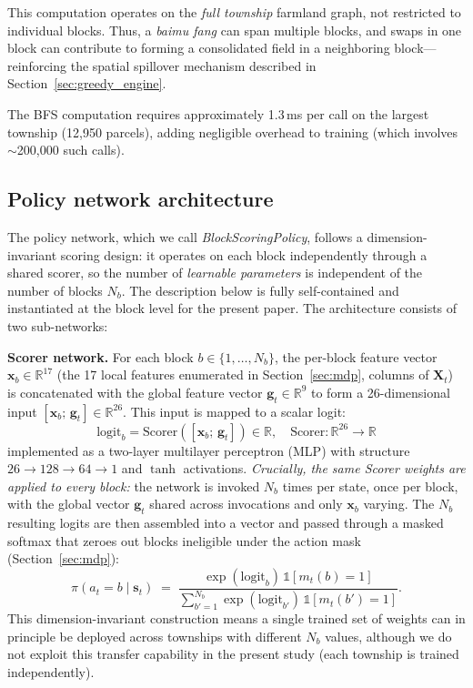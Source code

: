 \documentclass[preprint,12pt]{elsarticle}
\begin{document}
This computation operates on the \textit{full township} farmland graph, not restricted to individual blocks. Thus, a \textit{baimu fang} can span multiple blocks, and swaps in one block can contribute to forming a consolidated field in a neighboring block---reinforcing the spatial spillover mechanism described in Section~\ref{sec:greedy_engine}.

The BFS computation requires approximately 1.3\,ms per call on the largest township (12{,}950 parcels), adding negligible overhead to training (which involves $\sim$200{,}000 such calls).

\subsection{Policy network architecture}
\label{sec:policy}

The policy network, which we call \textit{BlockScoringPolicy}, follows a dimension-invariant scoring design: it operates on each block independently through a shared scorer, so the number of \textit{learnable parameters} is independent of the number of blocks $N_b$. The description below is fully self-contained and instantiated at the block level for the present paper. The architecture consists of two sub-networks:

\textbf{Scorer network.} For each block $b \in \{1,\dots,N_b\}$, the per-block feature vector $\mathbf{x}_b \in \mathbb{R}^{17}$ (the 17 local features enumerated in Section~\ref{sec:mdp}, columns of $\mathbf{X}_t$) is concatenated with the global feature vector $\mathbf{g}_t \in \mathbb{R}^{9}$ to form a 26-dimensional input $[\mathbf{x}_b;\, \mathbf{g}_t] \in \mathbb{R}^{26}$. This input is mapped to a scalar logit:
\begin{equation}
\text{logit}_b = \text{Scorer}\!\left([\mathbf{x}_b;\, \mathbf{g}_t]\right) \in \mathbb{R}, \quad \text{Scorer}: \mathbb{R}^{26} \to \mathbb{R}
\end{equation}
implemented as a two-layer multilayer perceptron (MLP) with structure $26 \to 128 \to 64 \to 1$ and $\tanh$ activations. \textit{Crucially, the same Scorer weights are applied to every block:} the network is invoked $N_b$ times per state, once per block, with the global vector $\mathbf{g}_t$ shared across invocations and only $\mathbf{x}_b$ varying. The $N_b$ resulting logits are then assembled into a vector and passed through a masked softmax that zeroes out blocks ineligible under the action mask (Section~\ref{sec:mdp}):
\begin{equation}
\pi(a_t = b \mid \mathbf{s}_t) \;=\; \frac{\exp(\text{logit}_b)\,\mathbb{1}[m_t(b)=1]}{\sum_{b'=1}^{N_b}\exp(\text{logit}_{b'})\,\mathbb{1}[m_t(b')=1]}.
\end{equation}
This dimension-invariant construction means a single trained set of weights can in principle be deployed across townships with different $N_b$ values, although we do not exploit this transfer capability in the present study (each township is trained independently).
\end{document}

